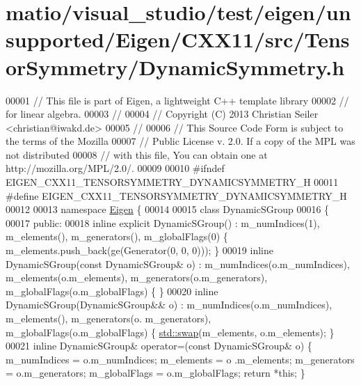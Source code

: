 \hypertarget{matio_2visual__studio_2test_2eigen_2unsupported_2_eigen_2_c_x_x11_2src_2_tensor_symmetry_2_dynamic_symmetry_8h_source}{}\section{matio/visual\+\_\+studio/test/eigen/unsupported/\+Eigen/\+C\+X\+X11/src/\+Tensor\+Symmetry/\+Dynamic\+Symmetry.h}
\label{matio_2visual__studio_2test_2eigen_2unsupported_2_eigen_2_c_x_x11_2src_2_tensor_symmetry_2_dynamic_symmetry_8h_source}

\begin{DoxyCode}
00001 \textcolor{comment}{// This file is part of Eigen, a lightweight C++ template library}
00002 \textcolor{comment}{// for linear algebra.}
00003 \textcolor{comment}{//}
00004 \textcolor{comment}{// Copyright (C) 2013 Christian Seiler <christian@iwakd.de>}
00005 \textcolor{comment}{//}
00006 \textcolor{comment}{// This Source Code Form is subject to the terms of the Mozilla}
00007 \textcolor{comment}{// Public License v. 2.0. If a copy of the MPL was not distributed}
00008 \textcolor{comment}{// with this file, You can obtain one at http://mozilla.org/MPL/2.0/.}
00009 
00010 \textcolor{preprocessor}{#ifndef EIGEN\_CXX11\_TENSORSYMMETRY\_DYNAMICSYMMETRY\_H}
00011 \textcolor{preprocessor}{#define EIGEN\_CXX11\_TENSORSYMMETRY\_DYNAMICSYMMETRY\_H}
00012 
00013 \textcolor{keyword}{namespace }\hyperlink{namespace_eigen}{Eigen} \{
00014 
00015 \textcolor{keyword}{class }DynamicSGroup
00016 \{
00017   \textcolor{keyword}{public}:
00018     \textcolor{keyword}{inline} \textcolor{keyword}{explicit} DynamicSGroup() : m\_numIndices(1), m\_elements(), m\_generators(), m\_globalFlags(0) \{ 
      m\_elements.push\_back(ge(Generator(0, 0, 0))); \}
00019     \textcolor{keyword}{inline} DynamicSGroup(\textcolor{keyword}{const} DynamicSGroup& o) : m\_numIndices(o.m\_numIndices), m\_elements(o.m\_elements), 
      m\_generators(o.m\_generators), m\_globalFlags(o.m\_globalFlags) \{ \}
00020     \textcolor{keyword}{inline} DynamicSGroup(DynamicSGroup&& o) : m\_numIndices(o.m\_numIndices), m\_elements(), m\_generators(o.
      m\_generators), m\_globalFlags(o.m\_globalFlags) \{ \hyperlink{endian_8c_a3ca5ecd34b04d6a243c054ac3a57f68d}{std::swap}(m\_elements, o.m\_elements); \}
00021     \textcolor{keyword}{inline} DynamicSGroup& operator=(\textcolor{keyword}{const} DynamicSGroup& o) \{ m\_numIndices = o.m\_numIndices; m\_elements = o
      .m\_elements; m\_generators = o.m\_generators; m\_globalFlags = o.m\_globalFlags; \textcolor{keywordflow}{return} *\textcolor{keyword}{this}; \}

\end{DoxyCode}
